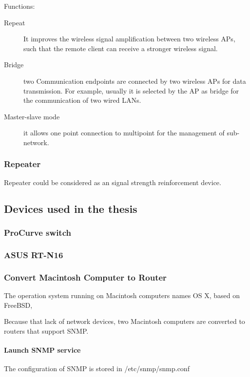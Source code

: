 Functions: 

\begin{description}
	\item[Repeat] It improves the wireless signal amplification between two wireless APs, such that the remote client can receive a stronger wireless signal.  
	\item[Bridge] two Communication endpoints are connected by two wireless APs for data transmission. For example, usually it is selected by the AP as bridge for the communication of two wired LANs.  
	\item[Master-slave mode] it allows one point connection to multipoint for the management of sub-network.  
\end{description}

\subsubsection{Repeater}
Repeater could be considered as an signal strength reinforcement device.

\subsection{Devices used in the thesis}

\subsubsection{ProCurve switch}

\subsubsection{ASUS RT-N16}

\subsubsection{Convert Macintosh Computer to Router}

The operation system running on Macintosh computers names OS X, based on FreeBSD, 

Because that lack of network devices, two Macintosh computers are converted to routers that support SNMP.

\paragraph{Launch SNMP service}

The configuration of SNMP is stored in /etc/snmp/snmp.conf

